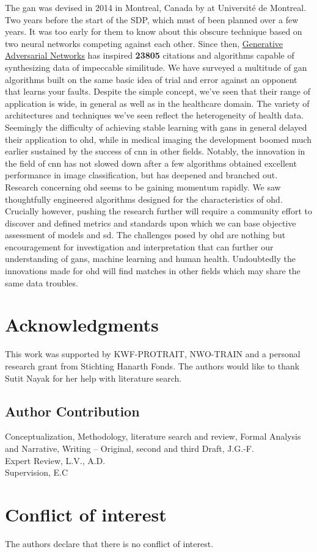 The \gls{gan} was devised in 2014 in Montreal, Canada by \citeauthor{goodgan} at Université de Montreal. Two years before the start of the SDP, which must of been planned over a few years. It was too early for them to know about this obscure technique based on two neural networks competing against each other. Since then, \href{http://papers.nips.cc/paper/5423-generative-adversarial-nets}{Generative Adversarial Networks} \cite{goodgan} has inspired \textbf{23805} citations and algorithms capable of synthesizing data of impeccable similitude. We have surveyed a multitude of \gls{gan} algorithms built on the same basic idea of trial and error against an opponent that learns your faults. Despite the simple concept, we've seen that their range of application is wide, in general as well as in the healthcare domain. The variety of architectures and techniques we've seen reflect the heterogeneity of health data. Seemingly the difficulty of achieving stable learning with \glspl{gan} in general delayed their application to \gls{ohd}, while in medical imaging the development boomed much earlier sustained by the success of \gls{cnn} in other fields. Notably, the innovation in the field of \gls{cnn} has not slowed down after a few algorithms obtained excellent performance in image classification, but has deepened and branched out. Research concerning \gls{ohd} seems to be gaining momentum rapidly. We saw thoughtfully engineered algorithms designed for the characteristics of \gls{ohd}. Crucially however, pushing the research further will require a community effort to discover and defined metrics and standards upon which we can base objective assessment of models and \gls{sd}. The challenges posed by \gls{ohd} are nothing but encouragement for investigation and interpretation that can further our understanding of \glspl{gan}, machine learning and human health. Undoubtedly the innovations made for \gls{ohd} will find matches in other fields which may share the same data troubles.
\section{Acknowledgments}
This work was supported by KWF-PROTRAIT, NWO-TRAIN and a personal research grant from Stichting Hanarth Fonds. The authors would like to thank Sutit Nayak for her help with literature search.
\subsection{Author Contribution}
\noindent
Conceptualization, Methodology, literature search and review, Formal Analysis and Narrative, Writing – Original, second and third Draft, J.G.-F.\\ 
Expert Review, L.V., A.D.\\
Supervision, E.C\\
\section*{Conflict of interest}
The authors declare that there is no conflict of interest.
\pagebreak